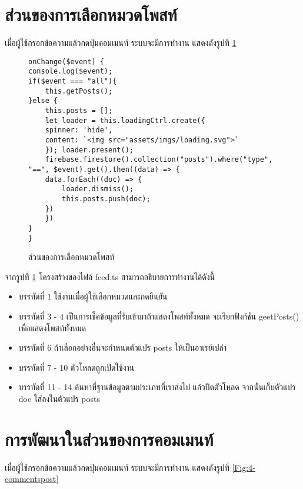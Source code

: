 

\section{ส่วนของการเลือกหมวดโพสท์}
เมื่อผู้ใช้กรอกข้อความแล้วกดปุ่มคอมเมนท์ ระบบจะมีการทำงาน แสดงดังรูปที่ \ref{Fig:4-selectpost}

\begin{figure}[H]
{\lstset{language=Pascal}
\begin{lstlisting}
onChange($event) {
console.log($event);
if($event === "all"){
	this.getPosts();
}else {
	this.posts = [];
	let loader = this.loadingCtrl.create({
	spinner: 'hide',
	content: `<img src="assets/imgs/loading.svg">`
	}); loader.present();
	firebase.firestore().collection("posts").where("type", "==", $event).get().then((data) => {
	data.forEach((doc) => {
		loader.dismiss();
		this.posts.push(doc);
	})
	})
}
}
\end{lstlisting}}
\caption{ส่วนของการเลือกหมวดโพสท์}
\label{Fig:4-selectpost}
\end{figure}

จากรูปที่ \ref{Fig:4-selectpost} โครงสร้างของไฟล์ feed.ts สามารถอธิบายการทำงานได้ดังนี้
\begin{itemize}[label={--}]
\item บรรทัดที่ 1 ใช้งานเมื่อผู้ใช้เลือกหมวดและกดยืนยัน
\item บรรทัดที่ 3 - 4 เป็นการเช็คข้อมูลที่รับเข้ามาถ้าแสดงโพสท์ทั้งหมด จะเรียกฟังก์ชัน geetPosts() เพื่อแสดงโพสท์ทั้งหมด
\item บรรทัดที่ 6 ถ้าเลือกอย่างอื่นจะกำหนดตัวแปร posts ให้เป็นอาเรย์เปล่า
\item บรรทัดที่ 7 - 10 ตัวโหลดถูกเปิดใช้งาน
\item บรรทัดที่ 11 - 14 ค้นหาที่ฐานข้อมูลตามประเภทที่เราส่งไป แล้วปิดตัวโหลด จากนั้นเก็บตัวแปร doc ใส่ลงในตัวแปร posts
\end{itemize}
\newpage



\section{การพัฒนาในส่วนของการคอมเมนท์}
เมื่อผู้ใช้กรอกข้อความแล้วกดปุ่มคอมเมนท์ ระบบจะมีการทำงาน แสดงดังรูปที่ \ref{Fig:4-commentspost}

